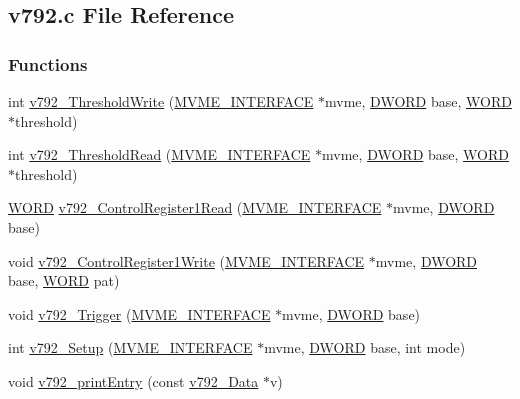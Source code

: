 \subsection{v792.c File Reference}
\label{v792_8c}
\subsubsection*{Functions}
\begin{DoxyCompactItemize}
\item 
int \hyperlink{v792_8c_a3eec625d3dca654c6f99f82d964d4287}{v792\_\-ThresholdWrite} (\hyperlink{structMVME__INTERFACE}{MVME\_\-INTERFACE} $\ast$mvme, \hyperlink{vt2_8h_a798af1e30bc65f319c1a246cecf59e39}{DWORD} base, \hyperlink{vt2_8h_a2b0e863dadf920709ec53d9088ee7c91}{WORD} $\ast$threshold)
\item 
int \hyperlink{v792_8c_a6410a5e010a043f3c1f0ccac13e89ec4}{v792\_\-ThresholdRead} (\hyperlink{structMVME__INTERFACE}{MVME\_\-INTERFACE} $\ast$mvme, \hyperlink{vt2_8h_a798af1e30bc65f319c1a246cecf59e39}{DWORD} base, \hyperlink{vt2_8h_a2b0e863dadf920709ec53d9088ee7c91}{WORD} $\ast$threshold)
\item 
\hyperlink{vt2_8h_a2b0e863dadf920709ec53d9088ee7c91}{WORD} \hyperlink{v792_8c_ab4e2ce6a3f923e95a23d9e6990265b8d}{v792\_\-ControlRegister1Read} (\hyperlink{structMVME__INTERFACE}{MVME\_\-INTERFACE} $\ast$mvme, \hyperlink{vt2_8h_a798af1e30bc65f319c1a246cecf59e39}{DWORD} base)
\item 
void \hyperlink{v792_8c_ac3b568047c03f5b511378cd608eb11fd}{v792\_\-ControlRegister1Write} (\hyperlink{structMVME__INTERFACE}{MVME\_\-INTERFACE} $\ast$mvme, \hyperlink{vt2_8h_a798af1e30bc65f319c1a246cecf59e39}{DWORD} base, \hyperlink{vt2_8h_a2b0e863dadf920709ec53d9088ee7c91}{WORD} pat)
\item 
void \hyperlink{v792_8c_a14c74a32db3fd4dacdeadfdfdefaff26}{v792\_\-Trigger} (\hyperlink{structMVME__INTERFACE}{MVME\_\-INTERFACE} $\ast$mvme, \hyperlink{vt2_8h_a798af1e30bc65f319c1a246cecf59e39}{DWORD} base)
\item 
int \hyperlink{v792_8c_ab1fa02b31b58838414803d8d750dbaa3}{v792\_\-Setup} (\hyperlink{structMVME__INTERFACE}{MVME\_\-INTERFACE} $\ast$mvme, \hyperlink{vt2_8h_a798af1e30bc65f319c1a246cecf59e39}{DWORD} base, int mode)
\item 
void \hyperlink{v792_8c_a24de5c4823e19a5361b4fd5fe4f1f087}{v792\_\-printEntry} (const \hyperlink{unionv792__Data}{v792\_\-Data} $\ast$v)
\end{DoxyCompactItemize}


